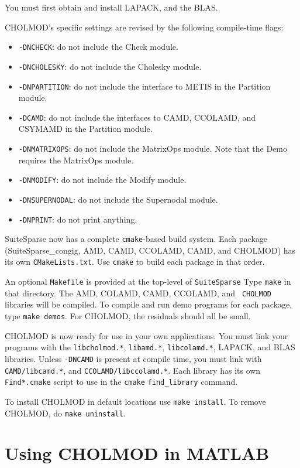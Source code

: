 \documentclass[11pt]{article}
\begin{document}
You must first obtain and install LAPACK, and the BLAS.

\noindent
CHOLMOD's specific settings are revised by the following compile-time flags:
\begin{itemize}
\item {\tt -DNCHECK}:       do not include the Check module.
\item {\tt -DNCHOLESKY}:    do not include the Cholesky module.
\item {\tt -DNPARTITION}:   do not include the interface to METIS in
                            the Partition module.
\item {\tt -DCAMD}:         do not include the interfaces to CAMD, CCOLAMD,
                            and CSYMAMD in the Partition module.
\item {\tt -DNMATRIXOPS}:   do not include the MatrixOps module.
                            Note that the Demo requires the MatrixOps module.
\item {\tt -DNMODIFY}:      do not include the Modify module.
\item {\tt -DNSUPERNODAL}:  do not include the Supernodal module.
\item {\tt -DNPRINT}:       do not print anything.
\end{itemize}

SuiteSparse now has a complete \verb'cmake'-based build system.  Each package
(SuiteSparse\_congig, AMD, CAMD, CCOLAMD, CAMD, and CHOLMOD) has its own
\verb'CMakeLists.txt'.  Use \verb'cmake' to build each package in that order.

An optional \verb'Makefile' is provided at the top-level of \verb'SuiteSparse'
Type {\tt make} in that directory.  The AMD, COLAMD, CAMD, CCOLAMD, and {\tt
CHOLMOD} libraries will be compiled.  To compile and run demo programs for each
package, type \verb'make demos'.  For CHOLMOD, the residuals should all be
small.

CHOLMOD is now ready for use in your own applications.  You must link your
programs with the {\tt libcholmod.*}, {\tt libamd.*}, {\tt libcolamd.*},
LAPACK, and BLAS libraries.  Unless {\tt -DNCAMD} is present at compile time,
you must link with {\tt CAMD/libcamd.*}, and {\tt CCOLAMD/libccolamd.*}.  Each
library has its own \verb'Find*.cmake' script to use in the \verb'cmake'
\verb'find_library' command.

To install CHOLMOD in default locations use {\tt make install}.  To remove
CHOLMOD, do {\tt make uninstall}.

\newpage \section{Using CHOLMOD in MATLAB}
\end{document}
